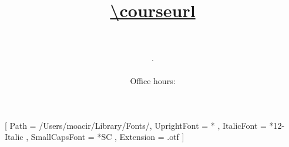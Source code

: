 
\nocite{*}
\bibliocommand





\setmainfont{EBGaramond}[
  Path = /Users/moacir/Library/Fonts/,
  UprightFont = * ,
  ItalicFont = *12-Italic ,
  SmallCapsFont = *SC ,
  Extension = .otf 
  ]
\setsansfont[Mapping=tex-text]{Helvetica} 
\setmonofont[Mapping=tex-text,Scale=0.8]{DejaVu Sans Mono}

\title{\LARGE {\normalsize \textsc{\coursecode}\\} \HUGE \mytitle \\ \Large\url{\courseurl}}     
\author{\Large\instructor\\ \small\texttt{\noindent\instructoremail}}
\date{\courseterm. \courseroom \\ \coursetime \\ \small Office hours: \officehours}

\maketitle

